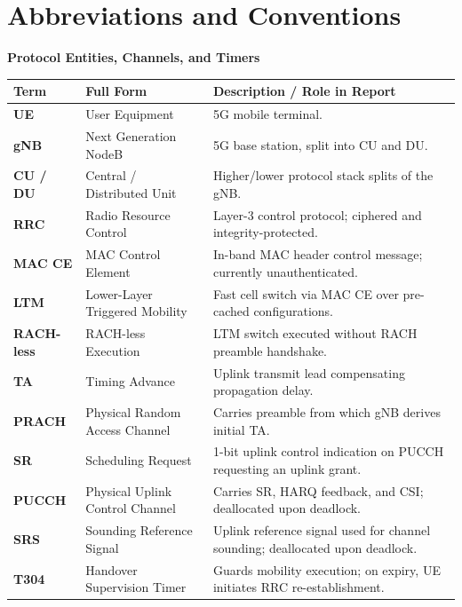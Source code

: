 \chapter*{Abbreviations and Conventions}
\vspace{-1.0em}

{\singlespacing\scriptsize
\renewcommand{\arraystretch}{0.92}
\noindent\textbf{Protocol Entities, Channels, and Timers}
\vspace{-0.4em}
\begin{center}
\begin{tabularx}{\textwidth}{@{}l p{4.9cm} X@{}}
\toprule
\textbf{Term} & \textbf{Full Form} & \textbf{Description / Role in Report} \\
\midrule
\textbf{UE} & User Equipment & 5G mobile terminal. \\
\textbf{gNB} & Next Generation NodeB & 5G base station, split into CU and DU. \\
\textbf{CU / DU} & Central / Distributed Unit & Higher/lower protocol stack splits of the gNB. \\
\textbf{RRC} & Radio Resource Control & Layer-3 control protocol; ciphered and integrity-protected. \\
\textbf{MAC CE} & MAC Control Element & In-band MAC header control message; currently unauthenticated. \\
\textbf{LTM} & Lower-Layer Triggered Mobility & Fast cell switch via MAC CE over pre-cached configurations. \\
\textbf{RACH-less} & RACH-less Execution & LTM switch executed without RACH preamble handshake. \\
\textbf{TA} & Timing Advance & Uplink transmit lead compensating propagation delay. \\
\textbf{PRACH} & Physical Random Access Channel & Carries preamble from which gNB derives initial TA. \\
\textbf{SR} & Scheduling Request & 1-bit uplink control indication on PUCCH requesting an uplink grant. \\
\textbf{PUCCH} & Physical Uplink Control Channel & Carries SR, HARQ feedback, and CSI; deallocated upon deadlock. \\
\textbf{SRS} & Sounding Reference Signal & Uplink reference signal used for channel sounding; deallocated upon deadlock. \\
\textbf{T304} & Handover Supervision Timer & Guards mobility execution; on expiry, UE initiates RRC re-establishment. \\

\end{tabularx}
\end{center}}
